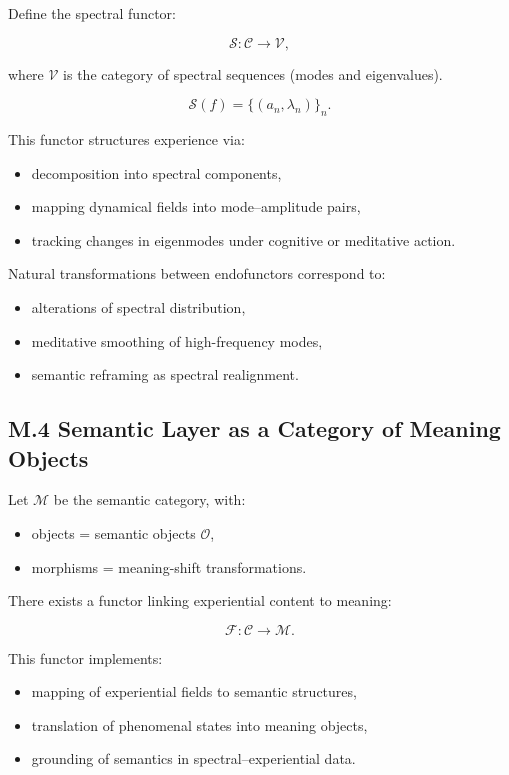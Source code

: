 \documentclass[12pt]{article}
\begin{document}
Define the spectral functor:

\[
\mathcal{S} : \mathcal{C} \to \mathcal{V},
\]

where $\mathcal{V}$ is the category of spectral sequences (modes and
eigenvalues).

\[
\mathcal{S}(f)
=
\{ (a_n, \lambda_n) \}_n.
\]

This functor structures experience via:

\begin{itemize}
    \item decomposition into spectral components,
    \item mapping dynamical fields into mode–amplitude pairs,
    \item tracking changes in eigenmodes under cognitive or meditative action.
\end{itemize}

Natural transformations between endofunctors correspond to:

\begin{itemize}
    \item alterations of spectral distribution,
    \item meditative smoothing of high-frequency modes,
    \item semantic reframing as spectral realignment.
\end{itemize}

\subsection*{M.4 Semantic Layer as a Category of Meaning Objects}

Let $\mathcal{M}$ be the semantic category, with:

\begin{itemize}
    \item objects = semantic objects $\mathcal{O}$,
    \item morphisms = meaning-shift transformations.
\end{itemize}

There exists a functor linking experiential content to meaning:

\[
\mathcal{F}: \mathcal{C} \to \mathcal{M}.
\]

This functor implements:

\begin{itemize}
    \item mapping of experiential fields to semantic structures,
    \item translation of phenomenal states into meaning objects,
    \item grounding of semantics in spectral–experiential data.
\end{itemize}
\end{document}
